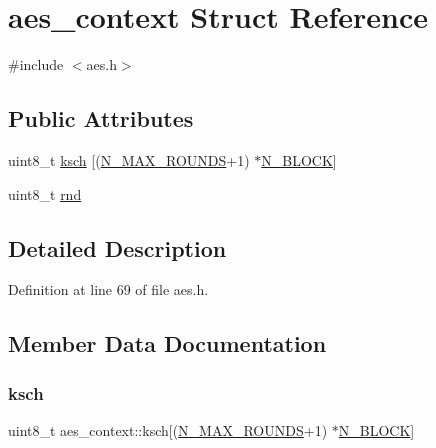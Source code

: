 \hypertarget{structaes__context}{}\section{aes\+\_\+context Struct Reference}
\label{structaes__context}


{\ttfamily \#include $<$aes.\+h$>$}

\subsection*{Public Attributes}
\begin{DoxyCompactItemize}
\item 
uint8\+\_\+t \mbox{\hyperlink{structaes__context_ab476c78bbf83cabeb637d33c43cc35ee}{ksch}} \mbox{[}(\mbox{\hyperlink{aes_8h_af8b900ecc3a113f2aed001ac9e1cb11e}{N\+\_\+\+M\+A\+X\+\_\+\+R\+O\+U\+N\+DS}}+1) $\ast$\mbox{\hyperlink{aes_8h_a64c8b1a34c03210cc4c214735bb4f186}{N\+\_\+\+B\+L\+O\+CK}}\mbox{]}
\item 
uint8\+\_\+t \mbox{\hyperlink{structaes__context_ab762dfbe068d5ecc737d864d00459fa0}{rnd}}
\end{DoxyCompactItemize}


\subsection{Detailed Description}


Definition at line 69 of file aes.\+h.



\subsection{Member Data Documentation}
\mbox{\label{structaes__context_ab476c78bbf83cabeb637d33c43cc35ee}} 
\subsubsection{\texorpdfstring{ksch}{ksch}}
{\footnotesize\ttfamily uint8\+\_\+t aes\+\_\+context\+::ksch\mbox{[}(\mbox{\hyperlink{aes_8h_af8b900ecc3a113f2aed001ac9e1cb11e}{N\+\_\+\+M\+A\+X\+\_\+\+R\+O\+U\+N\+DS}}+1) $\ast$\mbox{\hyperlink{aes_8h_a64c8b1a34c03210cc4c214735bb4f186}{N\+\_\+\+B\+L\+O\+CK}}\mbox{]}}



